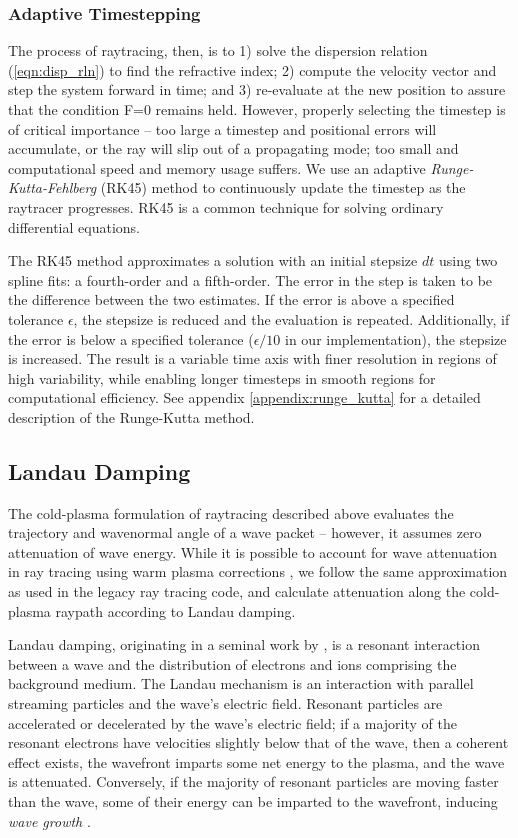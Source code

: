 \subsubsection{Adaptive Timestepping}
The process of raytracing, then, is to 1) solve the dispersion relation (\ref{eqn:disp_rln}) to find the refractive index; 2) compute the velocity vector and step the system forward in time; and 3) re-evaluate at the new position to assure that the condition F=0 remains held. However, properly selecting the timestep is of critical importance -- too large a timestep and positional errors will accumulate, or the ray will slip out of a propagating mode; too small and computational speed and memory usage suffers. We use an adaptive \emph{Runge-Kutta-Fehlberg} (RK45) \citep{Fehlberg1969, Mathews2004} method to continuously update the timestep as the raytracer progresses. RK45 is a common technique for solving ordinary differential equations.

The RK45 method approximates a solution with an initial stepsize $dt$ using two spline fits: a fourth-order and a fifth-order. The error in the step is taken to be the difference between the two estimates. If the error is above a specified tolerance $\epsilon$, the stepsize is reduced and the evaluation is repeated. Additionally, if the error is below a specified tolerance ($\epsilon/10$ in our implementation), the stepsize is increased. The result is a variable time axis with finer resolution in regions of high variability, while enabling longer timesteps in smooth regions for computational efficiency. See appendix \ref{appendix:runge_kutta} for a detailed description of the Runge-Kutta method.

\subsection{Landau Damping}
\label{section:damping}
The cold-plasma formulation of raytracing described above evaluates the trajectory and wavenormal angle of a wave packet -- however, it assumes zero attenuation of wave energy. While it is possible to account for wave attenuation in ray tracing using warm plasma corrections \citep{Sazhin1993, Henyey1980}, we follow the same approximation as used in the legacy ray tracing code, and calculate attenuation along the cold-plasma raypath according to Landau damping.

Landau damping, originating in a seminal work by \cite{Landau1946}, is a resonant interaction between a wave and the distribution of electrons and ions comprising the background medium. The Landau mechanism is an interaction with parallel streaming particles and the wave's electric field. Resonant particles are accelerated or decelerated by the wave's electric field; if a majority of the resonant electrons have velocities slightly below that of the wave, then a coherent effect exists, the wavefront imparts some net energy to the plasma, and the wave is attenuated. Conversely, if the majority of resonant particles are moving faster than the wave, some of their energy can be imparted to the wavefront, inducing \emph{wave growth} \citep{Chen1983, Kulkarni2009}. 

